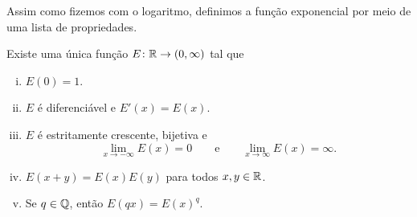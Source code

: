 Assim como fizemos com o logaritmo, definimos a função exponencial por meio
de uma lista de propriedades.

\begin{prop}
Existe uma única função $E \colon {\mathbb{R}} \to (0,\infty)$ tal que
\begin{enumerate}[(i)]
\item \label{it:exp:i}
$E(0) = 1$.
\item \label{it:exp:ii}
$E$ é diferenciável e $E'(x) = E(x)$.
\item \label{it:exp:iii}
$E$ é estritamente crescente, bijetiva e
\begin{equation*}
\lim_{x\to -\infty} E(x) = 0 \qquad \text{e} \qquad
\lim_{x\to \infty} E(x) = \infty .
\end{equation*}
\item \label{it:exp:iv}
$E(x+y) = E(x)E(y)$ para todos $x,y \in {\mathbb{R}}$.
\item \label{it:exp:v}
Se $q \in {\mathbb{Q}}$, então
$E(qx) = {E(x)}^q$.
\end{enumerate}
\end{prop}

